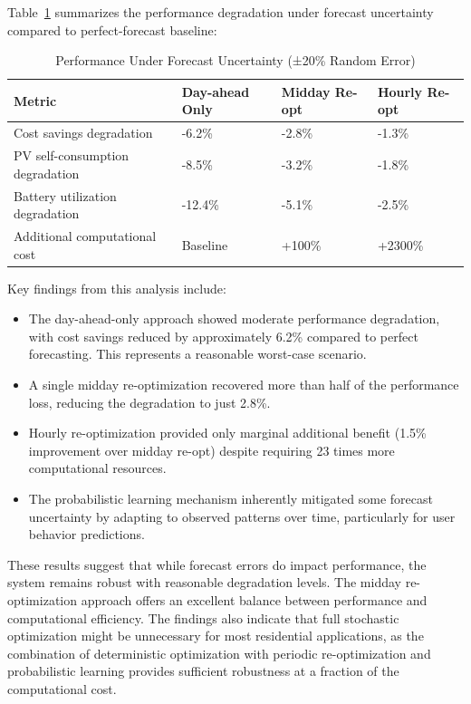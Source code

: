 \documentclass[12pt,a4paper]{article}
\begin{document}
Table~\ref{tab:forecast_error} summarizes the performance degradation under forecast uncertainty compared to perfect-forecast baseline:

\begin{table}[h]
\centering
\caption{Performance Under Forecast Uncertainty (±20\% Random Error)}
\label{tab:forecast_error}
\begin{tabular}{|p{4.5cm}|p{3cm}|p{3cm}|p{3cm}|}
\hline
\textbf{Metric} & \textbf{Day-ahead Only} & \textbf{Midday Re-opt} & \textbf{Hourly Re-opt} \\ \hline
Cost savings degradation & -6.2\% & -2.8\% & -1.3\% \\ \hline
PV self-consumption degradation & -8.5\% & -3.2\% & -1.8\% \\ \hline
Battery utilization degradation & -12.4\% & -5.1\% & -2.5\% \\ \hline
Additional computational cost & Baseline & +100\% & +2300\% \\ \hline
\end{tabular}
\end{table}

Key findings from this analysis include:

\begin{itemize}
    \item The day-ahead-only approach showed moderate performance degradation, with cost savings reduced by approximately 6.2\% compared to perfect forecasting. This represents a reasonable worst-case scenario.
    \item A single midday re-optimization recovered more than half of the performance loss, reducing the degradation to just 2.8\%.
    \item Hourly re-optimization provided only marginal additional benefit (1.5\% improvement over midday re-opt) despite requiring 23 times more computational resources.
    \item The probabilistic learning mechanism inherently mitigated some forecast uncertainty by adapting to observed patterns over time, particularly for user behavior predictions.
\end{itemize}

These results suggest that while forecast errors do impact performance, the system remains robust with reasonable degradation levels. The midday re-optimization approach offers an excellent balance between performance and computational efficiency. The findings also indicate that full stochastic optimization might be unnecessary for most residential applications, as the combination of deterministic optimization with periodic re-optimization and probabilistic learning provides sufficient robustness at a fraction of the computational cost.
\end{document}

